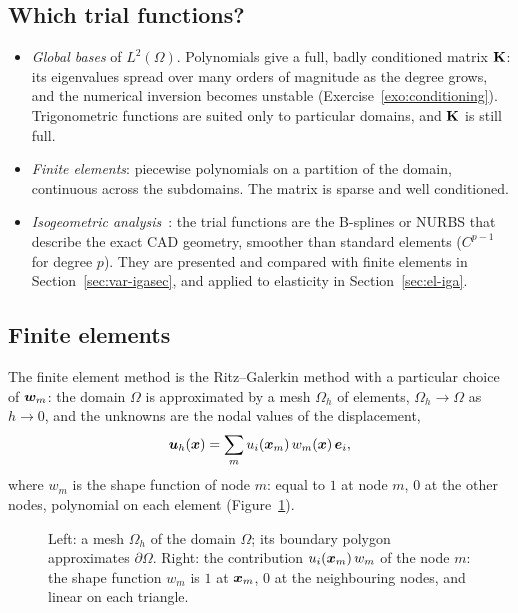 \subsection{Which trial functions?}
%
\begin{itemize}
\item \emph{Global bases} of $L^2(\Omega)$. Polynomials give a full,
badly conditioned matrix $\mathbf{K}$: its eigenvalues spread over many orders of
magnitude as the degree grows, and the numerical inversion becomes unstable
(Exercise~\ref{exo:conditioning}). Trigonometric functions are suited only to
particular domains, and $\mathbf{K}$ is still full.
\item \emph{Finite elements}: piecewise polynomials on a partition of the
domain, continuous across the subdomains. The matrix is sparse and well
conditioned.
\item \emph{Isogeometric analysis}~\cite{HughesCottrellBazilevs2005,CottrellHughesBazilevs2009}:
%
the trial functions are the B-splines or NURBS that describe the exact CAD
geometry, smoother than standard elements ($C^{p-1}$ for degree $p$). They
are presented and compared with finite elements in
Section~\ref{sec:var-igasec}, and applied to elasticity in
Section~\ref{sec:el-iga}.
\end{itemize}

\subsection{Finite elements}
%
The finite element method is the Ritz--Galerkin method with a particular
choice of $\bm{w}_m$: the domain $\Omega$ is approximated by a mesh $\Omega_h$
of elements, $\Omega_h\to\Omega$ as $h\to0$, and the unknowns are the nodal
values of the displacement,
\[
  \bm{u}_h(\bm{x})=\sum_{m}u_i(\bm{x}_m)\,w_m(\bm{x})\,\bm{e}_i ,
\]
where $w_m$ is the shape function of node $m$: equal to $1$ at node $m$, $0$ at
the other nodes, polynomial on each element (Figure~\ref{fig:fem}).
\begin{figure}[h]
\centering

\caption{Left: a mesh $\Omega_h$ of the domain $\Omega$; its boundary polygon
approximates $\partial\Omega$. Right: the contribution $u_i(\bm{x}_m)\,w_m$ of the
node $m$: the shape function $w_m$ is $1$ at $\bm{x}_m$, $0$ at the neighbouring
nodes, and linear on each triangle.}
\label{fig:fem}
\end{figure}

